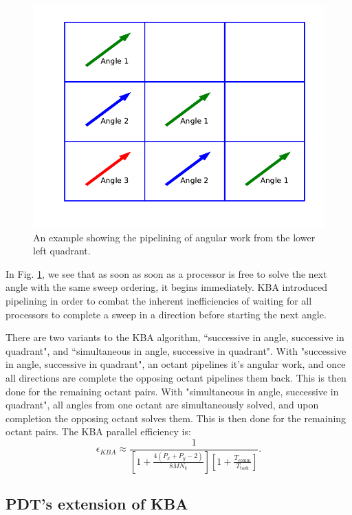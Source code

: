 \documentclass[11pt, letterpaper,titlepage,oneside]{article}
\begin{document}
\begin{figure}[H]
\centering
\includegraphics[scale=0.75,trim={0cm 1cm 0cm 0cm},clip]{../figures/pipeline_example.pdf}
\caption{An example showing the pipelining of angular work from the lower left quadrant.}
\label{pipeline_example}
\end{figure}

In Fig. \ref{pipeline_example}, we see that as soon as soon as a processor is free to solve the next angle with the same sweep ordering, it begins immediately. KBA introduced pipelining in order to combat the inherent inefficiencies of waiting for all processors to complete a sweep in a direction before starting the next angle. 

There are two variants to the KBA algorithm, ``successive in angle, successive in quadrant", and ``simultaneous in angle, successive in quadrant".  With "successive in angle, successive in quadrant", an octant pipelines it's angular work, and once all directions are complete the opposing octant pipelines them back. This is then done for the remaining octant pairs. With "simultaneous in angle, successive in quadrant", all angles from one octant are simultaneously solved, and upon completion the opposing octant solves them. This is then done for the remaining octant pairs. The KBA parallel efficiency\cite{mpadams2013} is:
\begin{equation}
  \epsilon_{KBA} \approx \frac{1}{[1 + \frac{4(P_x+P_y-2)}{8MN_k}][1 + \frac{T_{\text{comm}}}{T_{\text{{task}}}}]}.
\end{equation}

\subsection{PDT's extension of KBA}
\end{document}
